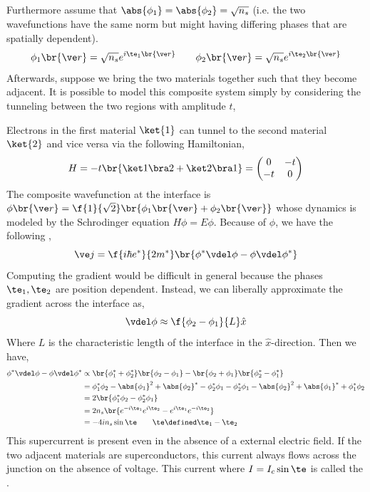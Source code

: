 \documentclass{article}
\begin{document}
Furthermore assume that $\abs{\phi_1} = \abs{\phi_2} = \sqrt{n_s}$ (i.e. the two wavefunctions have the same norm but might having differing phases that are spatially dependent).
\[ \phi_1\br{\ve r} = \sqrt{n_s} e^{i\te_1\br{\ve r}} \qquad \phi_2\br{\ve r} = \sqrt{n_s} e^{i\te_2\br{\ve r}} \]
Afterwards, suppose we bring the two materials together such that they become adjacent. It is possible to model this composite system simply by considering the tunneling between the two regions with amplitude $t$,
\begin{center}
\end{center}
Electrons in the first material $\ket{1}$ can tunnel to the second material $\ket{2}$ and vice versa via the following Hamiltonian,
\[ H = - t \br{\ket 1 \bra 2 + \ket 2 \bra 1} = \begin{pmatrix}
    0 & -t \\ -t & 0
\end{pmatrix} \]
The composite wavefunction at the interface is $\phi\br{\ve r} = \f{1}{\sqrt{2}} \br{\phi_1\br{\ve r} + \phi_2\br{\ve r}}$ whose dynamics is modeled by the Schrodinger equation $H\phi = E \phi$. Because of $\phi$, we have the following ,
\[ \ve j = \f{i \hbar e^{*}}{2m^{*}} \br{\phi^{*} \vdel \phi - \phi \vdel \phi^*} \]
Computing the gradient would be difficult in general because the phases $\te_1, \te_2$ are position dependent. Instead, we can liberally approximate the gradient across the interface as,
\[ \vdel \phi \approx \f{\phi_2 - \phi_1}{L} \hat x \]
Where $L$ is the characteristic length of the interface in the $\hat x$-direction. Then we have,
\begin{align*}
    \phi^* \vdel \phi - \phi \vdel \phi^*
    &\propto \br{\phi_1^* + \phi_2^*}\br{\phi_2 - \phi_1} - \br{\phi_2 + \phi_1} \br{\phi_2^* - \phi_1^*} \\
    &= \phi_1^* \phi_2 - \abs{\phi_1}^2 + \abs{\phi_2}^* - \phi_2^* \phi_1 - \phi_2^* \phi_1 - \abs{\phi_2}^2 + \abs{\phi_1}^* + \phi_1^* \phi_2 \\
    &= 2\br{\phi_1^* \phi_2 - \phi_2^* \phi_1} \\
    &= 2n_s \br{e^{-i\te_1}e^{i\te_2} - e^{i\te_1}e^{-i\te_2}} \\
    &= -4 i n_s \sin \te \qquad \te \defined \te_1 - \te_2
\end{align*}
This supercurrent is present even in the absence of a external electric field. If the two adjacent materials are superconductors, this current always flows across the junction on the absence of voltage. This current where $I = I_c \sin \te$ is called the .\\
\end{document}
